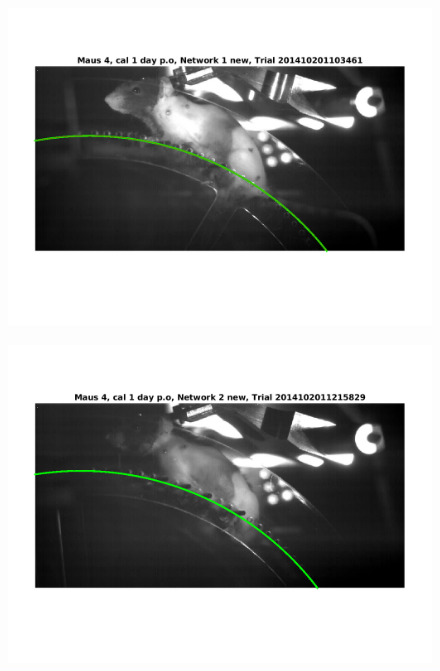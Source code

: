 \documentclass[
	fontsize=12pt,
	paper=a4,
	twoside=false,
	numbers=noenddot,
	plainheadsepline,
	toc=listof,
	toc=bibliography
]{scrartcl}
\begin{document}

\begin{figure} [htb]
	\centering
	\includegraphics[scale = 0.6]{images/mouse4/result_Maus_4_cal_1_day_Network_1_new_2.png}
\end{figure}
\begin{figure} [htb] \centering
	\includegraphics[scale = 0.6]{images/mouse4/result_Maus_4_cal_1_day_Network_2_new.png}
\end{figure}
\end{document}
